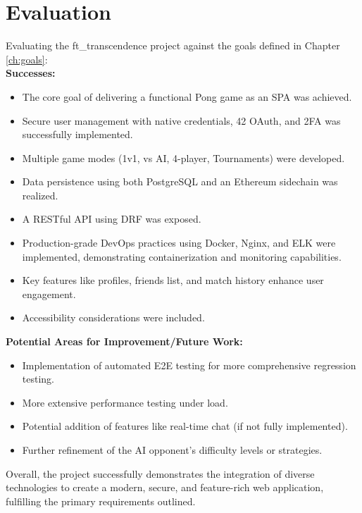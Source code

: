 \section{Evaluation}
\label{sec:evaluation}
Evaluating the ft\_transcendence project against the goals defined in Chapter \ref{ch:goals}:\\
\textbf{Successes:}
\begin{itemize}
    \item The core goal of delivering a functional Pong game as an SPA was achieved.
    \item Secure user management with native credentials, 42 OAuth, and 2FA was successfully implemented.
    \item Multiple game modes (1v1, vs AI, 4-player, Tournaments) were developed.
    \item Data persistence using both PostgreSQL and an Ethereum sidechain was realized.
    \item A RESTful API using DRF was exposed.
    \item Production-grade DevOps practices using Docker, Nginx, and ELK were implemented, demonstrating containerization and monitoring capabilities.
    \item Key features like profiles, friends list, and match history enhance user engagement.
    \item Accessibility considerations were included.
\end{itemize}

\textbf{Potential Areas for Improvement/Future Work:}
\begin{itemize}
    \item Implementation of automated E2E testing for more comprehensive regression testing.
    \item More extensive performance testing under load.
    \item Potential addition of features like real-time chat (if not fully implemented).
    \item Further refinement of the AI opponent's difficulty levels or strategies.
\end{itemize}
Overall, the project successfully demonstrates the integration of diverse technologies to create a modern, secure, and feature-rich web application, fulfilling the primary requirements outlined.